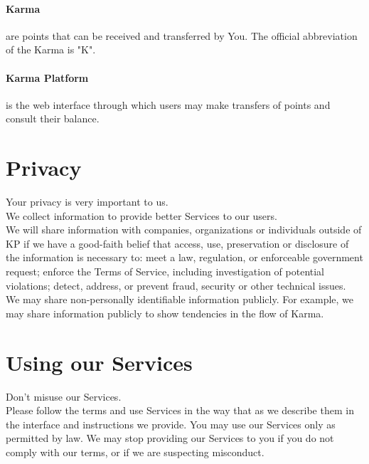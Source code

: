 \documentclass[12pt,a4paper]{article}
\begin{document}
\paragraph{Karma}

are points that can be received and transferred by You. The official abbreviation of the Karma is "K".

\paragraph{Karma Platform}

is the web interface through which users may make transfers of points and consult their balance. 

\section{Privacy}

Your privacy is very important to us. \\

We collect information to provide better Services to our users. \\

We will share information with companies, organizations or individuals outside of KP if we have a good-faith belief that access, use, preservation or disclosure of the information is necessary to: meet a law, regulation, or enforceable government request; enforce the Terms of Service, including investigation of potential violations; detect, address, or prevent fraud, security or other technical issues. \\

We may share non-personally identifiable information publicly. For example, we may share information publicly to show tendencies in the flow of Karma. 

\section{Using our Services}

Don't misuse our Services. \\

Please follow the terms and use Services in the way that as we describe them in the interface and instructions we provide. You may use our Services only as permitted by law. We may stop providing our Services to you if you do not comply with our terms, or if we are suspecting misconduct.\\
\end{document}
